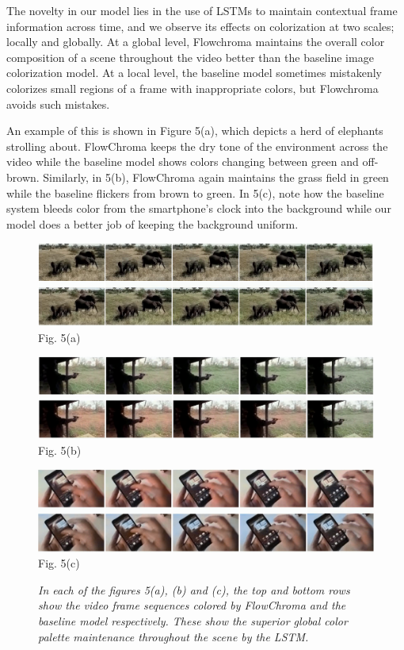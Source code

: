\documentclass[10pt,twocolumn,letterpaper]{article}
\begin{document}
The novelty in our model lies in the use of LSTMs to maintain contextual frame information across time, and we observe its effects on colorization at two scales;  locally and globally. At a global level, Flowchroma maintains the overall color composition of a scene throughout the video better than the baseline image colorization model. At a local level, the baseline model sometimes mistakenly colorizes small regions of a frame with inappropriate colors, but Flowchroma avoids such mistakes.

An example of this is shown in Figure 5(a), which depicts a herd of elephants strolling about. FlowChroma keeps the dry tone of the environment across the video while the baseline model shows colors changing between green and off-brown. Similarly, in 5(b), FlowChroma again maintains the grass field in green while the baseline flickers from brown to green. In 5(c), note how the baseline system bleeds color from the smartphone’s clock into the background while our model does a better job of keeping the background uniform. 

\begin{figure}[!h]
	\includegraphics[width=\textwidth]{fc-dk-elephants.jpg}
    \label{}{\footnotesize Fig. 5(a)}
\end{figure}
\begin{figure}[!h]
	\includegraphics[width=\textwidth]{fc-dk-shooting.png}
    \label{}{\footnotesize Fig. 5(b)}
\end{figure}
\begin{figure}[!h]
	\includegraphics[width=\textwidth]{fc-dk-mobile-phone.png}
    \label{}{\footnotesize Fig. 5(c)}
    \caption{\textit{In each of the figures 5(a), (b) and (c), the top and bottom rows show the video frame sequences colored by FlowChroma and the baseline model respectively. These show the superior global color palette maintenance throughout the scene by the LSTM.}}
\end{figure}
\end{document}
